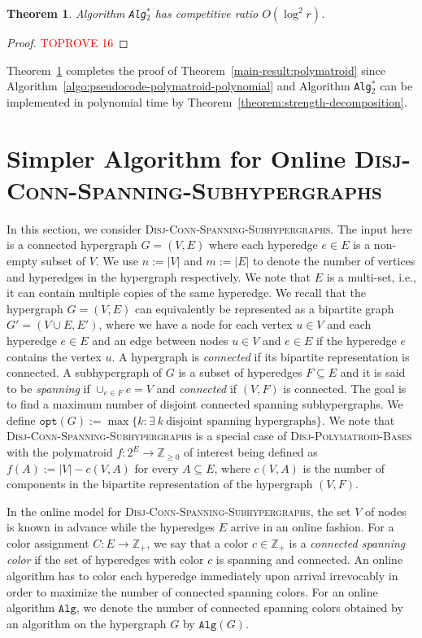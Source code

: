 \documentclass[11pt]{article}
\newtheorem{theorem}{Theorem}
\theoremstyle{definition}
\newcommand{\Z}{\mathbb{Z}}
\newcommand{\DPB}{\textsc{Disj-Polymatroid-Bases}\xspace}
\newcommand{\DCSS}{\textsc{Disj-Conn-Spanning-Subhypergraphs}\xspace}
\newcommand{\opt}{\texttt{opt}}
\begin{document}
\begin{theorem}\label{theorem:approximation-poly}
    Algorithm \texttt{Alg$_2^*$} has competitive ratio $O(\log^2 r)$.
\end{theorem}
\begin{proof}\textcolor{red}{TOPROVE 16}\end{proof}

Theorem~\ref{theorem:approximation-poly} completes the proof of Theorem~\ref{main-result:polymatroid} since Algorithm~\ref{algo:pseudocode-polymatroid-polynomial} and Algorithm \texttt{Alg$_2^*$} can be implemented in polynomial time by Theorem~\ref{theorem:strength-decomposition}. \section{Simpler Algorithm for Online \DCSS}\label{section:hypergraph-faster-algo}
In this section, we consider \DCSS. The input here is a connected hypergraph $G=(V, E)$ where each hyperedge $e\in E$ is a non-empty subset of $V$. We use $n:=|V|$ and $m:=|E|$ to denote the number of vertices and hyperedges in the hypergraph respectively.
We note that $E$ is a multi-set, i.e., it can contain multiple copies of the same hyperedge. We recall that the hypergraph $G=(V, E)$ can equivalently be represented as a bipartite graph $G'=(V\cup E, E')$, where we have a node for each vertex $u\in V$ and each hyperedge $e\in E$ and an edge between nodes $u\in V$ and $e\in E$ if the hyperedge $e$ contains the vertex $u$. A hypergraph is \emph{connected} if its bipartite representation is connected. A subhypergraph of $G$ is a subset of hyperedges $F\subseteq E$ and it is said to be \emph{spanning} if $\cup_{e\in F}e=V$ and \emph{connected} if $(V, F)$ is connected.
The goal is to find a maximum number of disjoint connected spanning subhypergraphs. We define $\opt(G):=\max\{k: \exists \ k \ \text{disjoint spanning hypergraphs}\}$. We note that \DCSS is a special case of \DPB with the polymatroid $f:2^E\rightarrow \Z_{\ge 0}$ of interest being defined as $f(A):=|V|-c(V,A)$ for every $A\subseteq E$, where $c(V,A)$ is the number of components in the bipartite representation of the hypergraph $(V,F)$.

In the online model for \DCSS, the set $V$ of nodes is known in advance while the hyperedges $E$ arrive in an online fashion. For a color assignment $C: E \rightarrow \mathbb{Z}_+$, we say that a color $c\in \Z_+$ is a \emph{connected spanning color} if the set  of hyperedges with color $c$ is spanning and connected. An online algorithm has to color each hyperedge immediately upon arrival irrevocably in order to maximize the number of connected spanning colors. For an online algorithm $\texttt{Alg}$, we denote the number of connected spanning colors obtained by an algorithm on the hypergraph $G$ by $\texttt{Alg}(G)$. 
\end{document}

